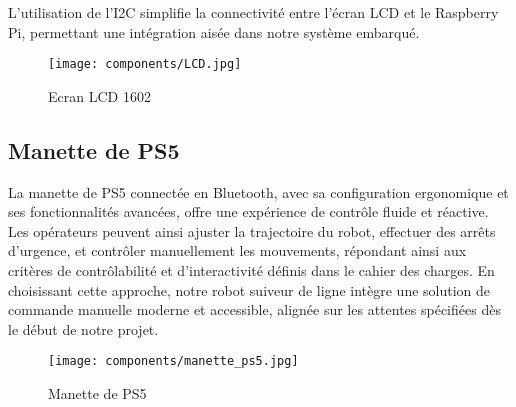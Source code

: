 L'utilisation de l'I2C simplifie la connectivité entre l'écran LCD et le Raspberry Pi, permettant une intégration aisée dans notre système embarqué.

\begin{figure}[h]
    \centering
    \texttt{[image: components/LCD.jpg]}
    \caption{Ecran LCD 1602}
    \label{fig:LCD1602}
\end{figure}

\subsection{Manette de PS5}
La manette de PS5 connectée en Bluetooth, avec sa configuration ergonomique et ses fonctionnalités avancées, offre une expérience de contrôle fluide et réactive. Les opérateurs peuvent ainsi ajuster la trajectoire du robot, effectuer des arrêts d'urgence, et contrôler manuellement les mouvements, répondant ainsi aux critères de contrôlabilité et d'interactivité définis dans le cahier des charges. En choisissant cette approche, notre robot suiveur de ligne intègre une solution de commande manuelle moderne et accessible, alignée sur les attentes spécifiées dès le début de notre projet.

\begin{figure}[h]
    \centering
    \texttt{[image: components/manette\_ps5.jpg]}
    \caption{Manette de PS5}
    \label{fig:Manette de PS5}
\end{figure}

\newpage